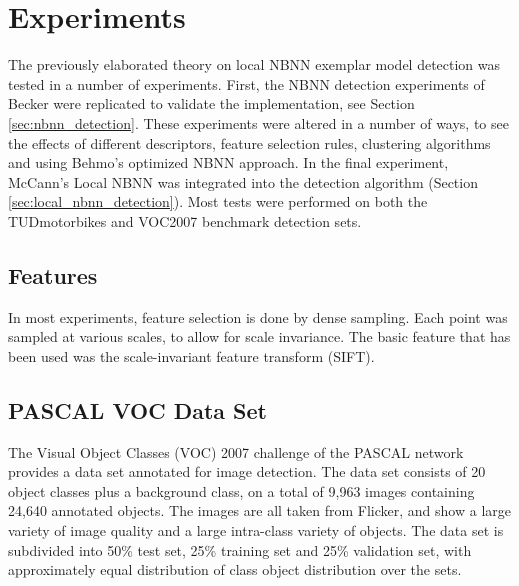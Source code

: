 \section{Experiments} %
\label{cha:experimental_setup}

The previously elaborated theory on local NBNN exemplar model detection was tested in a number of experiments. First, the NBNN detection experiments of Becker \cite{becker2012codebook} were replicated to validate the implementation, see Section \ref{sec:nbnn_detection}. These experiments were altered in a number of ways, to see the effects of different descriptors, feature selection rules, clustering algorithms and using Behmo's optimized NBNN approach. In the final experiment, McCann's Local NBNN was integrated into the detection algorithm (Section \ref{sec:local_nbnn_detection}). Most tests were performed on both the TUDmotorbikes and VOC2007 benchmark detection sets.

\subsection{Features} %
\label{sec:features}

In most experiments, feature selection is done by dense sampling. Each point was sampled at various scales, to allow for scale invariance. The basic feature that has been used was the scale-invariant feature transform (SIFT). \cite{lowe2004distinctive}



\subsection{PASCAL VOC Data Set} %

\label{sec:voc_data_set}
The Visual Object Classes (VOC) 2007 challenge of the PASCAL network \cite{pascal-voc-2007} provides a data set annotated for image detection. The data set consists of 20 object classes plus a background class, on a total of 9,963 images containing 24,640 annotated objects. The images are all taken from Flicker, and show a large variety of image quality and a large intra-class variety of objects. The data set is subdivided into 50\% test set, 25\% training set and 25\% validation set, with approximately equal distribution of class object distribution over the sets.

